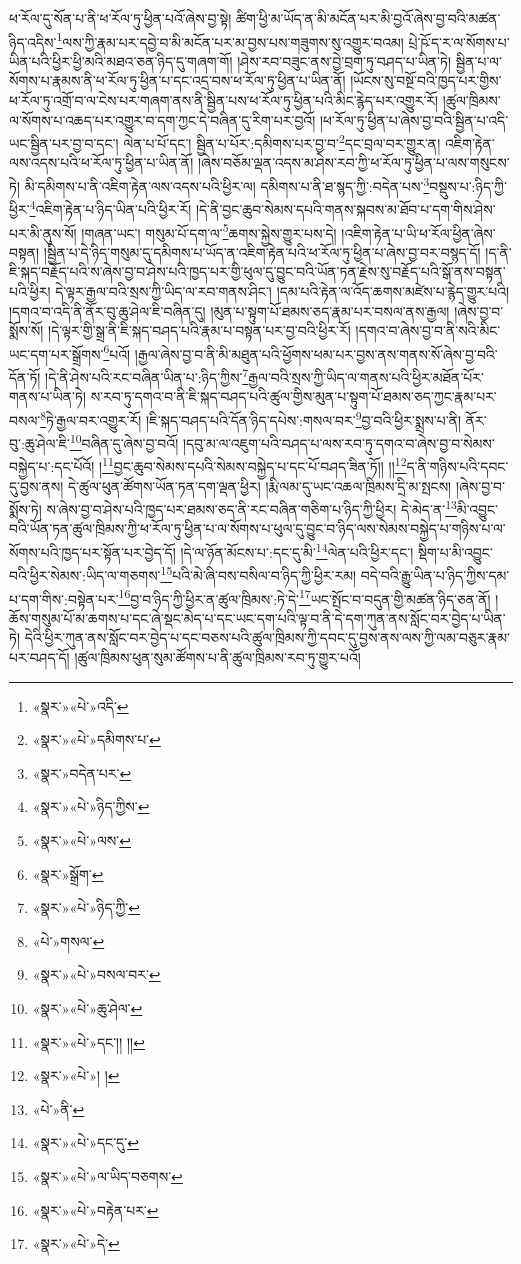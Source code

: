 ཕ་རོལ་དུ་སོན་པ་ནི་ཕ་རོལ་ཏུ་ཕྱིན་པའོ་ཞེས་བྱ་སྟེ། ཚིག་ཕྱི་མ་ཡོད་ན་མི་མངོན་པར་མི་བྱའོ་ཞེས་བྱ་བའི་མཚན་ཉིད་འདིས་\footnote{«སྣར་»«པེ་»འདི་}ལས་ཀྱི་རྣམ་པར་དབྱེ་བ་མི་མངོན་པར་མ་བྱས་པས་གཟུགས་སུ་འགྱུར་བའམ། པྲེ་ཥོ་ད་ར་ལ་སོགས་པ་ཡིན་པའི་ཕྱིར་ཕྱི་མའི་མཐའ་ཅན་ཉིད་དུ་གཞག་གོ། །ཤེས་རབ་བཟུང་ནས་བྱེ་བྲག་ཏུ་བཤད་པ་ཡིན་ཏེ། སྦྱིན་པ་ལ་སོགས་པ་རྣམས་ནི་ཕ་རོལ་ཏུ་ཕྱིན་པ་དང་འདྲ་བས་ཕ་རོལ་ཏུ་ཕྱིན་པ་ཡིན་ནོ། །ཡོངས་སུ་བསྔོ་བའི་ཁྱད་པར་གྱིས་ཕ་རོལ་ཏུ་འགྲོ་བ་ལ་ངེས་པར་གཞག་ནས་ནི་སྦྱིན་པས་ཕ་རོལ་ཏུ་ཕྱིན་པའི་མིང་རྙེད་པར་འགྱུར་རོ། །ཚུལ་ཁྲིམས་ལ་སོགས་པ་འཆད་པར་འགྱུར་བ་དག་ཀྱང་དེ་བཞིན་དུ་རིག་པར་བྱའོ། །ཕ་རོལ་ཏུ་ཕྱིན་པ་ཞེས་བྱ་བའི་སྦྱིན་པ་འདི་ཡང་སྦྱིན་པར་བྱ་བ་དང་། ལེན་པ་པོ་དང་། སྦྱིན་པ་པོར་:དམིགས་པར་བྱ་བ་\footnote{«སྣར་»«པེ་»དམིགས་པ་}དང་བྲལ་བར་གྱུར་ན། འཇིག་རྟེན་ལས་འདས་པའི་ཕ་རོལ་ཏུ་ཕྱིན་པ་ཡིན་ནོ། །ཞེས་བཅོམ་ལྡན་འདས་མ་ཤེས་རབ་ཀྱི་ཕ་རོལ་ཏུ་ཕྱིན་པ་ལས་གསུངས་ཏེ། མི་དམིགས་པ་ནི་འཇིག་རྟེན་ལས་འདས་པའི་ཕྱིར་ལ། དམིགས་པ་ནི་ཐ་སྙད་ཀྱི་:བདེན་པས་\footnote{«སྣར་»བདེན་པར་}བསྡུས་པ་:ཉིད་ཀྱི་ཕྱིར་\footnote{«སྣར་»«པེ་»ཉིད་ཀྱིས་}འཇིག་རྟེན་པ་ཉིད་ཡིན་པའི་ཕྱིར་རོ། །དེ་ནི་བྱང་ཆུབ་སེམས་དཔའི་གནས་སྐབས་མ་ཐོབ་པ་དག་གིས་ཤེས་པར་མི་ནུས་སོ། །གཞན་ཡང་། གསུམ་པོ་དག་ལ་\footnote{«སྣར་»«པེ་»ལས་}ཆགས་སྐྱེས་གྱུར་པས་དེ། །འཇིག་རྟེན་པ་ཡི་ཕ་རོལ་ཕྱིན་ཞེས་བསྟན། །སྦྱིན་པ་དེ་ཉིད་གསུམ་དུ་དམིགས་པ་ཡོད་ན་འཇིག་རྟེན་པའི་ཕ་རོལ་ཏུ་ཕྱིན་པ་ཞེས་བྱ་བར་བསྙད་དོ། །ད་ནི་ཇི་སྐད་བརྗོད་པའི་ས་ཞེས་བྱ་བ་ཤེས་པའི་ཁྱད་པར་གྱི་ཕུལ་དུ་བྱུང་བའི་ཡོན་ཏན་རྗེས་སུ་བརྗོད་པའི་སྒོ་ནས་བསྟན་པའི་ཕྱིར། དེ་ལྟར་རྒྱལ་བའི་སྲས་ཀྱི་ཡིད་ལ་རབ་གནས་ཤིང་། །དམ་པའི་རྟེན་ལ་འོད་ཆགས་མཛེས་པ་རྙེད་གྱུར་པའི། །དགའ་བ་འདི་ནི་ནོར་བུ་ཆུ་ཤེལ་ཇི་བཞིན་དུ། །མུན་པ་སྟུག་པོ་ཐམས་ཅད་རྣམ་པར་བསལ་ནས་རྒྱལ། །ཞེས་བྱ་བ་སྨོས་སོ། །དེ་ལྟར་གྱི་སྒྲ་ནི་ཇི་སྐད་བཤད་པའི་རྣམ་པ་བསྟན་པར་བྱ་བའི་ཕྱིར་རོ། །དགའ་བ་ཞེས་བྱ་བ་ནི་སའི་མིང་ཡང་དག་པར་སྒྲོགས་\footnote{«སྣར་»སྒྲོག་}པའོ། །རྒྱལ་ཞེས་བྱ་བ་ནི་མི་མཐུན་པའི་ཕྱོགས་ཕམ་པར་བྱས་ནས་གནས་སོ་ཞེས་བྱ་བའི་དོན་ཏོ། །དེ་ནི་ཤེས་པའི་རང་བཞིན་ཡིན་པ་:ཉིད་ཀྱིས་\footnote{«སྣར་»«པེ་»ཉིད་ཀྱི་}རྒྱལ་བའི་སྲས་ཀྱི་ཡིད་ལ་གནས་པའི་ཕྱིར་མཐོན་པོར་གནས་པ་ཡིན་ཏེ། ས་རབ་ཏུ་དགའ་བ་ནི་ཇི་སྐད་བཤད་པའི་ཚུལ་གྱིས་མུན་པ་སྟུག་པོ་ཐམས་ཅད་ཀྱང་རྣམ་པར་བསལ་\footnote{«པེ་»གསལ་}ཏེ་རྒྱལ་བར་འགྱུར་རོ། །ཇི་སྐད་བཤད་པའི་དོན་ཉིད་དཔེས་:གསལ་བར་\footnote{«སྣར་»«པེ་»བསལ་བར་}བྱ་བའི་ཕྱིར་སྨྲས་པ་ནི། ནོར་བུ་:ཆུ་ཤེལ་ཇི་\footnote{«སྣར་»«པེ་»ཆུ་ཤེལ་}བཞིན་དུ་ཞེས་བྱ་བའོ། །དབུ་མ་ལ་འཇུག་པའི་བཤད་པ་ལས་རབ་ཏུ་དགའ་བ་ཞེས་བྱ་བ་སེམས་བསྐྱེད་པ་:དང་པོའོ། །\footnote{«སྣར་»«པེ་»དང་།། །།}བྱང་ཆུབ་སེམས་དཔའི་སེམས་བསྐྱེད་པ་དང་པོ་བཤད་ཟིན་ཏོ།། །།\footnote{«སྣར་»«པེ་»། །}ད་ནི་གཉིས་པའི་དབང་དུ་བྱས་ནས། དེ་ཚུལ་ཕུན་ཚོགས་ཡོན་ཏན་དག་ལྡན་ཕྱིར། །རྨི་ལམ་དུ་ཡང་འཆལ་ཁྲིམས་དྲི་མ་སྤངས། །ཞེས་བྱ་བ་སྨོས་ཏེ། ས་ཞེས་བྱ་བ་ཤེས་པའི་ཁྱད་པར་ཐམས་ཅད་ནི་རང་བཞིན་གཅིག་པ་ཉིད་ཀྱི་ཕྱིར། དེ་མེད་ན་\footnote{«པེ་»ནི་}མི་འབྱུང་བའི་ཡོན་ཏན་ཚུལ་ཁྲིམས་ཀྱི་ཕ་རོལ་ཏུ་ཕྱིན་པ་ལ་སོགས་པ་ཕུལ་དུ་བྱུང་བ་ཉིད་ལས་སེམས་བསྐྱེད་པ་གཉིས་པ་ལ་སོགས་པའི་ཁྱད་པར་སྟོན་པར་བྱེད་དོ། །དེ་ལ་ཉོན་མོངས་པ་:དང་དུ་མི་\footnote{«སྣར་»«པེ་»དང་དུ་}ལེན་པའི་ཕྱིར་དང་། སྡིག་པ་མི་འབྱུང་བའི་ཕྱིར་སེམས་:ཡིད་ལ་གཅགས་\footnote{«སྣར་»«པེ་»ལ་ཡིད་བཅགས་}པའི་མེ་ཞི་བས་བསིལ་བ་ཉིད་ཀྱི་ཕྱིར་རམ། བདེ་བའི་རྒྱུ་ཡིན་པ་ཉིད་ཀྱིས་དམ་པ་དག་གིས་:བསྟེན་པར་\footnote{«སྣར་»«པེ་»བརྟེན་པར་}བྱ་བ་ཉིད་ཀྱི་ཕྱིར་ན་ཚུལ་ཁྲིམས་:ཏེ་དེ་\footnote{«སྣར་»«པེ་»དེ་}ཡང་སྤོང་བ་བདུན་གྱི་མཚན་ཉིད་ཅན་ནོ། །ཆོས་གསུམ་པོ་མ་ཆགས་པ་དང་ཞེ་སྡང་མེད་པ་དང་ཡང་དག་པའི་ལྟ་བ་ནི་དེ་དག་ཀུན་ནས་སློང་བར་བྱེད་པ་ཡིན་ཏེ། དེའི་ཕྱིར་ཀུན་ནས་སློང་བར་བྱེད་པ་དང་བཅས་པའི་ཚུལ་ཁྲིམས་ཀྱི་དབང་དུ་བྱས་ནས་ལས་ཀྱི་ལམ་བཅུར་རྣམ་པར་བཤད་དོ། །ཚུལ་ཁྲིམས་ཕུན་སུམ་ཚོགས་པ་ནི་ཚུལ་ཁྲིམས་རབ་ཏུ་གྱུར་པའོ། 